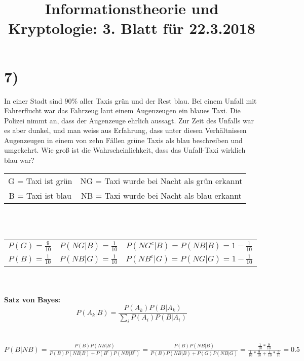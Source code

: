 \documentclass[11pt,a4paper]{article}
\begin{document}
	\title{Informationstheorie und Kryptologie: 3. Blatt für 22.3.2018}
	\maketitle

	\section*{7)}

	In einer Stadt sind 90\% aller Taxis grün und der Rest blau. Bei einem Unfall mit Fahrerflucht war das Fahrzeug laut einem Augenzeugen ein blaues Taxi. Die Polizei nimmt an, dass der Augenzeuge ehrlich aussagt. Zur Zeit des Unfalls war es aber dunkel, und man weiss aus Erfahrung, dass unter diesen Verhältnissen Augenzeugen in einem von zehn Fällen grüne Taxis als blau beschreiben und umgekehrt. Wie groß ist die Wahrscheinlichkeit, dass das Unfall-Taxi wirklich blau war?\\
	\newline
	\def\arraystretch{1.5}%
	\begin{tabular}{cc}
		G = Taxi ist grün & NG = Taxi wurde bei Nacht als grün erkannt \\
		B = Taxi ist blau & NB = Taxi wurde bei Nacht als blau erkannt \\
	\end{tabular} \\
	\\
	\def\arraystretch{1.5}%
	\begin{tabular}{c|c|c}
		\(P(G) = \frac{9}{10}\) & \(P(NG|B) = \frac{1}{10}\) & \(P(NG^c|B) = P(NB|B) = 1 - \frac{1}{10}\) \\
		\(P(B) = \frac{1}{10}\) & \(P(NB|G) = \frac{1}{10}\) & \(P(NB^c|G) = P(NG|G) = 1 - \frac{1}{10}\) \\
	\end{tabular} \\
	\\
	\textbf{Satz von Bayes:}\\
	\[P(A_k|B) = \frac{P(A_k)P(B|A_k)}{\sum_{i}^{}P(A_i)P(B|A_i)} \]\\
	\\
	\(P(B|NB) = \frac{P(B)P(NB|B)}{P(B)P(NB|B) + P(B^c)P(NB|B^c)} = \frac{P(B)P(NB|B)}{P(B)P(NB|B) + P(G)P(NB|G)} = \frac{\frac{1}{10}*\frac{9}{10}}{\frac{1}{10}*\frac{9}{10} + \frac{1}{10}*\frac{9}{10}} = 0.5 \) \\

	\newpage
\end{document}
